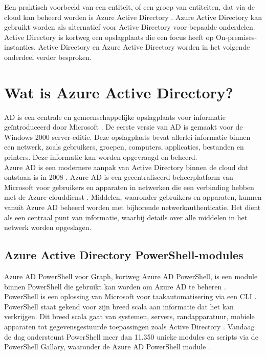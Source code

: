 Een praktisch voorbeeld van een entiteit, of een groep van entiteiten, dat via de cloud kan beheerd worden is Azure Active Directory \autocite{Microsoft2023c}. Azure Active Directory kan gebruikt worden als alternatief voor Active Directory voor bepaalde onderdelen. Active Directory is kortweg een opslagplaats die een focus heeft op On-premises-instanties. Active Directory en Azure Active Directory worden in het volgende onderdeel verder besproken.


\section{Wat is Azure Active Directory?}

\ac{AD} is een centrale en gemeenschappelijke opslagplaats voor informatie geïntroduceerd door Microsoft \autocite{Allen2003}. De eerste versie van \ac{AD} is gemaakt voor de Windows 2000 server-editie. Deze opslagplaats bevat allerlei informatie binnen een netwerk, zoals gebruikers, groepen, computers, applicaties, bestanden en printers. Deze informatie kan worden opgevraagd en beheerd. \\

Azure \ac{AD} is een modernere aanpak van Active Directory binnen de cloud dat ontstaan is in 2008 \autocite{Chappell2008}. Azure \ac{AD} is een gecentraliseerd beheerplatform van Microsoft voor gebruikers en apparaten in netwerken die een verbinding hebben met de Azure-clouddienst \autocite{Mayank2019}. Middelen, waaronder gebruikers en apparaten, kunnen vanuit Azure \ac{AD} beheerd worden met bijhorende netwerkauthenticatie. Het dient als een centraal punt van informatie, waarbij details over alle middelen in het netwerk worden opgeslagen.

\subsection{Azure Active Directory PowerShell-modules} 

Azure \ac{AD} PowerShell voor Graph, kortweg Azure \ac{AD} PowerShell, is een module binnen PowerShell die gebruikt kan worden om Azure \ac{AD} te beheren \autocite{Microsoft2023}. PowerShell is een oplossing van Microsoft voor taakautomatisering via een \ac{CLI} \autocite{Microsoft2022}. \\

PowerShell staat gekend voor zijn breed scala aan informatie dat het kan verkrijgen. Dit breed scala gaat van systemen, servers, randapparatuur, mobiele apparaten tot gegevensgestuurde toepassingen zoals Active Directory \autocite{Hosmer2019}. Vandaag de dag ondersteunt PowerShell meer dan 11.350 unieke modules en scripts via de PowerShell Gallary, waaronder de Azure \ac{AD} PowerShell module \autocite{Microsoft2023a}. \\

